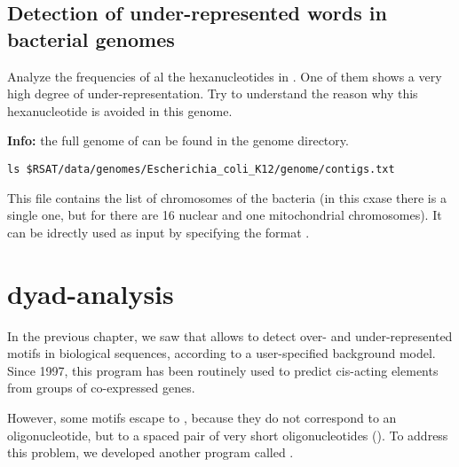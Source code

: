 \subsection{Detection of under-represented words in bacterial genomes}

\begin{exercise}

  Analyze the frequencies of al the hexanucleotides in
  . One of them shows a very high degree of
  under-representation. Try to understand the reason why this
  hexanucleotide is avoided in this genome.

  \textbf{Info:} the full genome of  can be
  found in the \RSAT genome directory.

{\color{Blue} \begin{footnotesize} 
\begin{verbatim}
ls $RSAT/data/genomes/Escherichia_coli_K12/genome/contigs.txt
\end{verbatim} \end{footnotesize}
}

This file contains the list of chromosomes of the bacteria (in this
cxase there is a single one, but for  there are 16 nuclear
and one mitochondrial chromosomes). It can be idrectly used as input
by specifying the format .
\end{exercise}


\section{dyad-analysis}

In the previous chapter, we saw that  allows
to detect over- and under-represented motifs in biological sequences,
according to a user-specified background model. Since 1997, this
program has been routinely used to predict cis-acting elements from
groups of co-expressed genes.

However, some motifs escape to , because they
do not correspond to an oligonucleotide, but to a spaced pair of very
short oligonucleotides (). To address this problem, we
developed another program called .

\tbw




